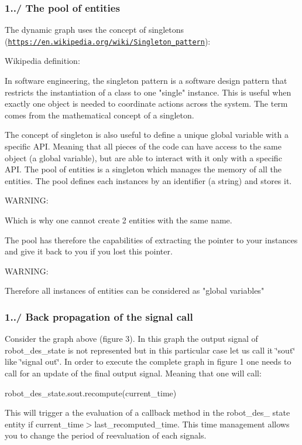 \hypertarget{index_intro_subsec_pool_entities}{}\subsubsection{1../ The pool of entities}\label{index_intro_subsec_pool_entities}
The dynamic graph uses the concept of singletons (\href{https://en.wikipedia.org/wiki/Singleton_pattern}{\tt https\+://en.\+wikipedia.\+org/wiki/\+Singleton\+\_\+pattern})\+:


\begin{DoxyCode}
Wikipedia definition:

In software engineering, the singleton pattern is a software
design pattern that restricts the instantiation of a \textcolor{keyword}{class }to one
"single" instance. This is useful when exactly one object is
needed to coordinate actions across the system. The term
comes from the mathematical concept of a singleton.
\end{DoxyCode}


The concept of singleton is also useful to define a unique global variable with a specific A\+PI. Meaning that all pieces of the code can have access to the same object (a global variable), but are able to interact with it only with a specific A\+PI. The pool of entities is a singleton which manages the memory of all the entities. The pool defines each instances by an identifier (a string) and stores it.


\begin{DoxyCode}
WARNING:

Which is why one cannot create 2 entities with the same name.
\end{DoxyCode}


The pool has therefore the capabilities of extracting the pointer to your instances and give it back to you if you lost this pointer.


\begin{DoxyCode}
WARNING:

Therefore all instances of entities can be considered as \textcolor{stringliteral}{"global variables"}
\end{DoxyCode}
\hypertarget{index_intro_subsec_back_propagation}{}\subsubsection{1../ Back propagation of the signal call}\label{index_intro_subsec_back_propagation}
 Consider the graph above (figure 3). In this graph the output signal of robot\+\_\+des\+\_\+state is not represented but in this particular case let us call it \char`\"{}sout\char`\"{} like \char`\"{}signal out\char`\"{}. In order to execute the complete graph in figure 1 one needs to call for an update of the final output signal. Meaning that one will call\+: 
\begin{DoxyCode}
robot\_des\_state.sout.recompute(current\_time)
\end{DoxyCode}
 This will trigger a the evaluation of a callback method in the robot\+\_\+des\+\_\+ state entity if current\+\_\+time$>$last\+\_\+recomputed\+\_\+time. This time management allows you to change the period of reevaluation of each signals.

